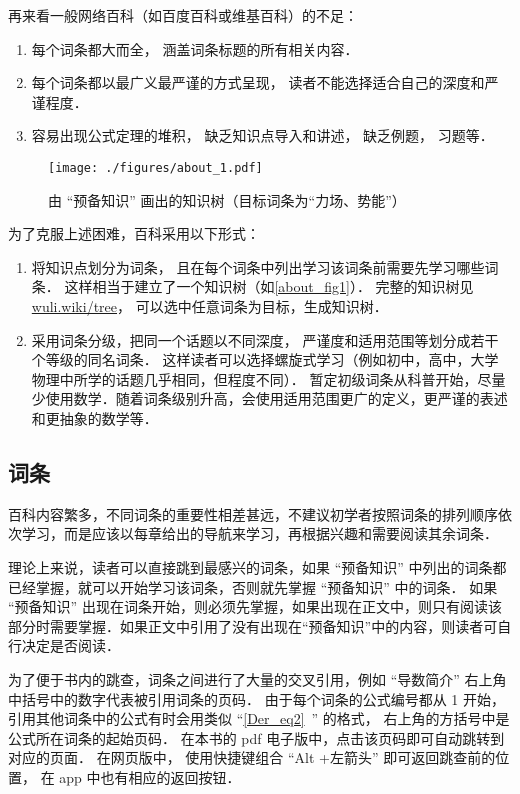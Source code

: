 再来看一般网络百科（如百度百科或维基百科）的不足：
\begin{enumerate}
\item 每个词条都大而全， 涵盖词条标题的所有相关内容．
\item 每个词条都以最广义最严谨的方式呈现， 读者不能选择适合自己的深度和严谨程度．
\item 容易出现公式定理的堆积， 缺乏知识点导入和讲述， 缺乏例题， 习题等．
\end{enumerate}

\begin{figure}[ht]
\centering
\texttt{[image: ./figures/about\_1.pdf]}
\caption{由 “预备知识” 画出的知识树（目标词条为“力场、势能”）}\label{about_fig1}
\end{figure}

为了克服上述困难，百科采用以下形式：
\begin{enumerate}
\item 将知识点划分为词条， 且在每个词条中列出学习该词条前需要先学习哪些词条． 这样相当于建立了一个知识树（如\autoref{about_fig1}）． 完整的知识树见 \href{https://wuli.wiki/tree}{wuli.wiki/tree}， 可以选中任意词条为目标，生成知识树．
\item 采用词条分级，把同一个话题以不同深度， 严谨度和适用范围等划分成若干个等级的同名词条． 这样读者可以选择螺旋式学习（例如初中，高中，大学物理中所学的话题几乎相同，但程度不同）． 暂定初级词条从科普开始，尽量少使用数学．随着词条级别升高，会使用适用范围更广的定义，更严谨的表述和更抽象的数学等．
\end{enumerate}

\subsection{词条}
百科内容繁多，不同词条的重要性相差甚远，不建议初学者按照词条的排列顺序依次学习，而是应该以每章给出的导航来学习，再根据兴趣和需要阅读其余词条．

理论上来说，读者可以直接跳到最感兴的词条，如果 “预备知识” 中列出的词条都已经掌握，就可以开始学习该词条，否则就先掌握 “预备知识” 中的词条． 如果 “预备知识” 出现在词条开始，则必须先掌握，如果出现在正文中，则只有阅读该部分时需要掌握．如果正文中引用了没有出现在“预备知识”中的内容，则读者可自行决定是否阅读．

为了便于书内的跳查，词条之间进行了大量的交叉引用，例如 “导数简介” 右上角中括号中的数字代表被引用词条的页码． 由于每个词条的公式编号都从 1 开始， 引用其他词条中的公式有时会用类似 “\autoref{Der_eq2}~” 的格式， 右上角的方括号中是公式所在词条的起始页码． 在本书的 pdf 电子版中，点击该页码即可自动跳转到对应的页面． 在网页版中， 使用快捷键组合 “Alt +左箭头” 即可返回跳查前的位置， 在 app 中也有相应的返回按钮．
